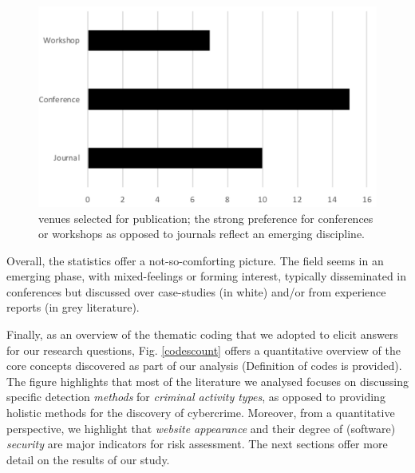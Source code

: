 \begin{figure}
\begin{center}
\includegraphics[scale=0.4]{./img/wvenue.png}
\end{center}
\caption{venues selected for publication; the strong preference for conferences or workshops as opposed to journals reflect an emerging discipline.}\label{w3}
\end{figure}

Overall, the statistics offer a not-so-comforting picture. The field seems in an emerging phase, with mixed-feelings or forming interest, typically disseminated in conferences but discussed over case-studies (in white) and/or from experience reports (in grey literature). 

Finally, as an overview of the thematic coding that we adopted to elicit answers for our research questions, Fig. \ref{codescount} offers a quantitative overview of the core concepts discovered as part of our analysis (Definition of codes is provided). The figure highlights that most of the literature we analysed focuses on discussing specific detection \emph{methods} for \emph{criminal activity types}, as opposed to providing holistic methods for the discovery of cybercrime. Moreover, from a quantitative perspective, we highlight that  \emph{website appearance} and their degree of (software) \emph{security} are major indicators for risk assessment. The next sections offer more detail on the results of our study.


